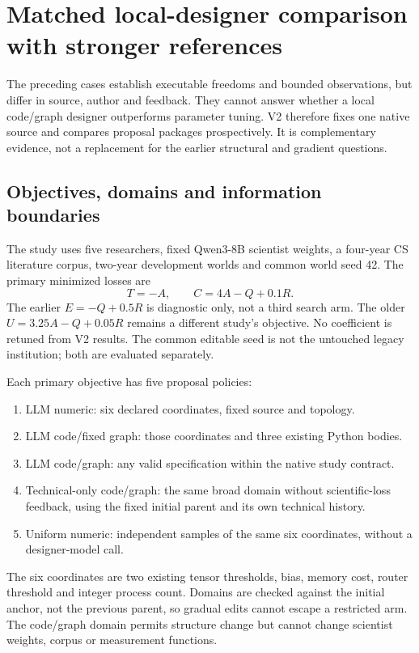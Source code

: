 \section{Matched local-designer comparison with stronger references}
\label{sec:matched}
The preceding cases establish executable freedoms and bounded observations,
but differ in source, author and feedback. They cannot answer whether a local
code/graph designer outperforms parameter tuning. V2 therefore fixes one native
source and compares proposal packages prospectively. It is complementary
evidence, not a replacement for the earlier structural and gradient questions.

\subsection{Objectives, domains and information boundaries}
The study uses five researchers, fixed Qwen3-8B scientist weights, a four-year
CS literature corpus, two-year development worlds and common world seed 42.
The primary minimized losses are
\begin{equation}
 T=-A,\qquad C=4A-Q+0.1R.
\end{equation}
The earlier $E=-Q+0.5R$ is diagnostic only, not a third search arm. The older
$U=3.25A-Q+0.05R$ remains a different study's objective. No coefficient is
retuned from V2 results. The common editable seed is not the untouched legacy
institution; both are evaluated separately.

Each primary objective has five proposal policies:
\begin{enumerate}[leftmargin=*,nosep]
 \item LLM numeric: six declared coordinates, fixed source and topology.
 \item LLM code/fixed graph: those coordinates and three existing Python bodies.
 \item LLM code/graph: any valid specification within the native study contract.
 \item Technical-only code/graph: the same broad domain without scientific-loss
 feedback, using the fixed initial parent and its own technical history.
 \item Uniform numeric: independent samples of the same six coordinates, without
 a designer-model call.
\end{enumerate}
The six coordinates are two existing tensor thresholds, bias, memory cost,
router threshold and integer process count. Domains are checked against the
initial anchor, not the previous parent, so gradual edits cannot escape a
restricted arm. The code/graph domain permits structure change but cannot
change scientist weights, corpus or measurement functions.

